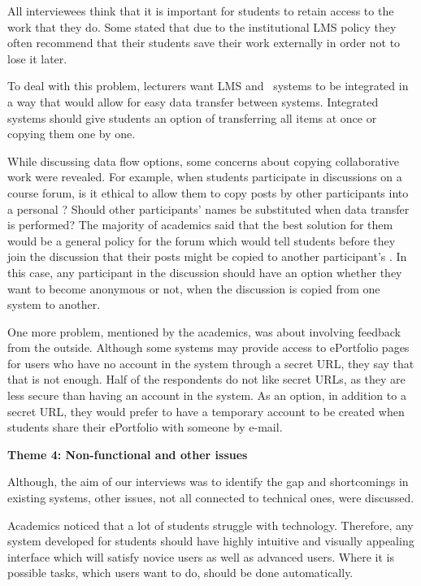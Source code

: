 All interviewees think that it is important for students to retain access to the
work that they do. Some stated that due to the institutional LMS policy they
often recommend that their students save their work externally in order not to
lose it later.

To deal with this problem, lecturers want LMS and \ep~systems to be integrated
in a way that would allow for easy data transfer between systems. Integrated
systems should give students an option of transferring all items at once or
copying them one by one.

While discussing data flow options, some concerns about copying collaborative
work were revealed. For example, when students participate in discussions on a
course forum, is it ethical to allow them to copy posts by other participants
into a personal \ep? Should other participants' names be substituted when
data transfer is performed? The majority of academics said that the best
solution for them would be a general policy for the forum which would tell
students before they join the discussion that their posts might be copied to
another participant's \ep. In this case, any participant in the
discussion should have an option whether they want to become anonymous or not,
when the discussion is copied from one system to another.

One more problem, mentioned by the academics, was about involving feedback from
the outside. Although some systems may provide access to ePortfolio pages for
users who have no account in the system through a secret URL, they say that that
is not enough. Half of the respondents do not like secret URLs, as they are less
secure than having an account in the system. As an option, in addition to a
secret URL, they would prefer to have a temporary account to be created when
students share their ePortfolio with someone by e-mail.

\textbf{Theme 4: Non-functional and other issues}

Although, the aim of our interviews was to identify the gap and shortcomings in
existing systems, other issues, not all connected to technical ones, were
discussed.

Academics noticed that a lot of students struggle with technology. Therefore,
any system developed for students should have highly intuitive and visually
appealing interface which will satisfy novice users as well as advanced users.
Where it is possible tasks, which users want to do, should be done
automatically.


